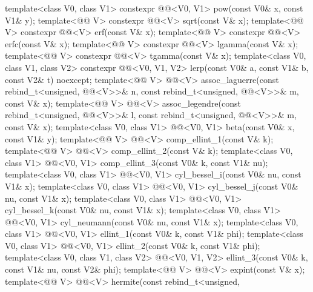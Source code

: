 \begin{itemdecl}
template<class V0, class V1>
  constexpr @@<V0, V1> pow(const V0& x, const V1& y);
template<@@ V> constexpr @@<V> sqrt(const V& x);
template<@@ V> constexpr @@<V> erf(const V& x);
template<@@ V> constexpr @@<V> erfc(const V& x);
template<@@ V> constexpr @@<V> lgamma(const V& x);
template<@@ V> constexpr @@<V> tgamma(const V& x);
template<class V0, class V1, class V2>
  constexpr @@<V0, V1, V2> lerp(const V0& a, const V1& b, const V2& t) noexcept;
template<@@ V>
  @@<V> assoc_laguerre(const rebind_t<unsigned, @@<V>>& n, const
    rebind_t<unsigned, @@<V>>& m, const V& x);
template<@@ V>
  @@<V> assoc_legendre(const rebind_t<unsigned, @@<V>>& l, const
    rebind_t<unsigned, @@<V>>& m, const V& x);
template<class V0, class V1>
  @@<V0, V1> beta(const V0& x, const V1& y);
template<@@ V> @@<V> comp_ellint_1(const V& k);
template<@@ V> @@<V> comp_ellint_2(const V& k);
template<class V0, class V1>
  @@<V0, V1> comp_ellint_3(const V0& k, const V1& nu);
template<class V0, class V1>
  @@<V0, V1> cyl_bessel_i(const V0& nu, const V1& x);
template<class V0, class V1>
  @@<V0, V1> cyl_bessel_j(const V0& nu, const V1& x);
template<class V0, class V1>
  @@<V0, V1> cyl_bessel_k(const V0& nu, const V1& x);
template<class V0, class V1>
  @@<V0, V1> cyl_neumann(const V0& nu, const V1& x);
template<class V0, class V1>
  @@<V0, V1> ellint_1(const V0& k, const V1& phi);
template<class V0, class V1>
  @@<V0, V1> ellint_2(const V0& k, const V1& phi);
template<class V0, class V1, class V2>
  @@<V0, V1, V2> ellint_3(const V0& k, const V1& nu, const V2& phi);
template<@@ V> @@<V> expint(const V& x);
template<@@ V> @@<V> hermite(const rebind_t<unsigned,

\end{itemdecl}
